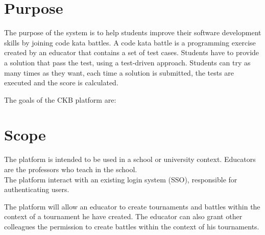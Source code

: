 \section{Purpose}
The purpose of the system is to help students improve their software development skills by joining code kata battles.
A code kata battle is a programming exercise created by an educator that contains a set of test cases.
Students have to provide a solution that pass the test, using a test-driven approach.
Students can try as many times as they want, each time a solution is submitted, the tests are executed and the score is calculated.

The goals of the CKB platform are:

\begin{enumerate}[label=\textbf{G\arabic*}:,ref=G\arabic*,leftmargin=1.3cm]
\end{enumerate}

\pagebreak

\section{Scope}
The platform is intended to be used in a school or university context.
Educators are the professors who teach in the school.\\
The platform interact with an existing login system (SSO), responsible for authenticating users.

The platform will allow an educator to create tournaments and battles within the context of a tournament he have created.
The educator can also grant other colleagues the permission to create battles within the context of his tournaments.

